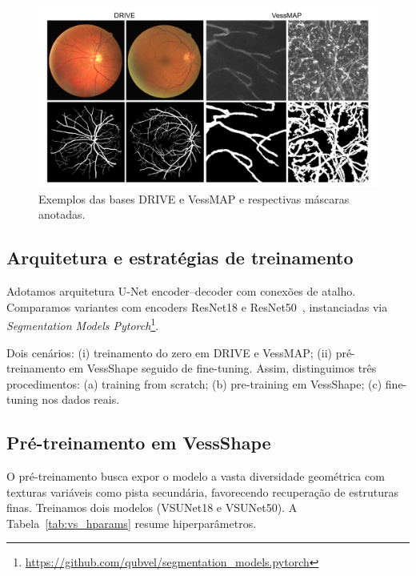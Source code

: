 \documentclass[%
reprint,
nofootinbib,
 amsmath,amssymb,
aps,
superscriptaddress,
showkeys,
longbibliography
]{revtex4-1}
\begin{document}
\begin{figure}[tbp]
    \centering
    \includegraphics[width=\columnwidth]{figures/results/drive_vessmap_samples.pdf}
    \caption{Exemplos das bases DRIVE e VessMAP e respectivas máscaras anotadas.}
    \label{f:drive_vessmap_samples}
\end{figure}

\subsection{Arquitetura e estratégias de treinamento}

Adotamos arquitetura U-Net encoder–decoder com conexões de atalho. Comparamos variantes com encoders ResNet18 e ResNet50~\cite{he2016deep}, instanciadas via \textit{Segmentation Models Pytorch}\footnote{\url{https://github.com/qubvel/segmentation_models.pytorch}}.

Dois cenários: (i) treinamento do zero em DRIVE e VessMAP; (ii) pré-treinamento em VessShape seguido de fine-tuning. Assim, distinguimos três procedimentos: (a) training from scratch; (b) pre-training em VessShape; (c) fine-tuning nos dados reais.

\subsection{Pré-treinamento em VessShape}

O pré-treinamento busca expor o modelo a vasta diversidade geométrica com texturas variáveis como pista secundária, favorecendo recuperação de estruturas finas. Treinamos dois modelos (VSUNet18 e VSUNet50). A Tabela~\ref{tab:vs_hparams} resume hiperparâmetros.
\end{document}
